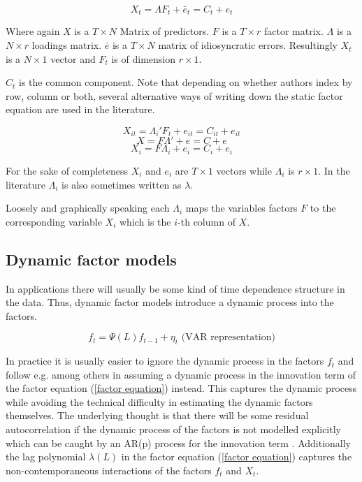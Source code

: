 \documentclass[12pt]{article}
\begin{document}
\begin{equation}
	\label{factor equation, t indexed}
	X_t = \Lambda F_t + \bar e_t = C_t + e_t
\end{equation}

Where again $X$ is a $T \times N$ Matrix of predictors. $F$ is a $T \times r$ factor matrix. $\Lambda$ is a $N \times r$ loadings matrix. $\bar e$ is a $T \times N$ matrix of idiosyncratic errors. Resultingly $X_t$ is a $N \times 1$ vector and $F_t$ is of dimension $r \times 1$.


$C_t$ is the common component.
Note that depending on whether authors index by row, column or both, several alternative ways of writing down the static factor equation are used in the literature.

\begin{equation}
	\label{factor equation, it indexed}
	X_{it} = \Lambda_i' F_t + e_{it} = C_{it} + e_{it}
\end{equation}
\begin{equation}
	\label{static factor equation}
	X = F \Lambda' + e = C + e
\end{equation}
\begin{equation}
	\label{factor equation, i indexed}
	X_i = F \Lambda_i + e_i = C_i + e_i
\end{equation}

For the sake of completeness $X_i$ and $e_i$ are $T \times 1$ vectors while $\Lambda_i$ is $r \times 1$. In the literature $\Lambda_i$ is also sometimes written as $\lambda$.

Loosely and graphically speaking each $\Lambda_i$ maps the variables factors $F$ to the corresponding variable $X_i$ which is the $i$-th column of $X$.



\subsection{Dynamic factor models}
In applications there will usually be some kind of time dependence structure in the data. Thus, dynamic factor models introduce a dynamic process into the factors.

\begin{equation}
	\label{time dependence of factors}
	f_t = \Psi(L) f_{t-1} + \eta_t \text{\ \ \ \ \ (VAR representation)}
\end{equation}

In practice it is usually easier to ignore the dynamic process in the factors $f_t$ and follow e.g. \citet{stock2005implications} among others in assuming a dynamic process in the innovation term of the factor equation (\ref{factor equation}) instead. This captures the dynamic process while avoiding the technical difficulty in estimating the dynamic factors themselves. The underlying thought is that there will be some residual autocorrelation if the dynamic process of the factors is not modelled explicitly which can be caught by an AR(p) process for the innovation term \citep{breitung2011gls}. Additionally the lag polynomial $\lambda(L)$ in the factor equation (\ref{factor equation}) captures the non-contemporaneous interactions of the factors $f_t$ and $X_t$.
\end{document}
